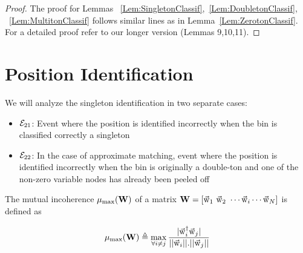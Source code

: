\begin{proof}
	The proof for Lemmas ~\ref{Lem:SingletonClassif},~\ref{Lem:DoubletonClassif}, ~\ref{Lem:MultitonClassif} follows similar lines as in Lemma~\ref{Lem:ZerotonClassif}. For a detailed proof refer to our longer version \cite{nagaraj2017pattern} (Lemmas 9,10,11).
\end{proof}
\section{Position Identification}
\label{Append:PositionIdentif}
We will analyze the singleton identification in two separate cases:
\begin{itemize}
\item $\mathcal{E}_{21}$: Event where the position is identified incorrectly when the bin is classified  correctly a singleton
\item $\mathcal{E}_{22}$: In the case of approximate matching, event where the position is identified incorrectly when the bin is originally a double-ton and one of the non-zero variable nodes has already been peeled off
\end{itemize}

\begin{definition}
	The mutual incoherence $\mu_{\text{max}}( \mathbf{W})$ of a matrix $\mathbf{W} = [\vec{\mathrm{w}}_1 ~ \vec{\mathrm{w}}_2 ~ \cdots \vec{\mathrm{w}}_i \cdots \vec{\mathrm{w}}_N ]$ is defined as 
	
	\[\mu_{\text{max}}(\mathbf{W}) \triangleq \max \limits_{\forall i \neq j} \frac{|\vec{\mathrm{w}}_i^{\dagger} \vec{\mathrm{w}}_j |}{||\vec{\mathrm{w}}_i || . ||\vec{\mathrm{w}}_j ||} \]
\end{definition}

